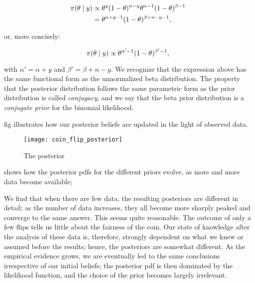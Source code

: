 \begin{align*}
    \pi \qty(\theta \mid y) &\propto \theta^y (1-\theta)^{n-y} \theta^{\alpha-1}(1-\theta)^{\beta -1} \\
    &= \theta^{\alpha + y -1} (1-\theta)^{\beta + n-y -1},
\end{align*}

or, more concisely:

\begin{equation}\label{eq:coin_posterior}
    \pi \qty(\theta \mid y) \propto \theta^{\alpha' -1} (1-\theta)^{\beta' -1},
\end{equation}

with $\alpha'=\alpha+y$ and $\beta' = \beta + n - y$. We recognize that the expression above has the same functional form as the unnormalized beta distribution. The property that the posterior distribution follows the same parametric form as the prior distribution is called \textit{conjugacy}, and we say that the beta prior distribution is a \textit{conjugate prior} for the binomial likelihood.  

fig illustrates how our posterior beliefs are updated in the light of observed data.

\begin{figure}[ht]
    \centering
    \texttt{[image: coin\_flip\_posterior]}
    \caption{The posterior
    }
    \label{fig:coin_flip_posterior}
\end{figure} 

shows how the posterior pdfs for the different priors evolve, as more and more data become available;


We find that when there are few data, the resulting posteriors are different in detail; as the number of data increases, they all become more sharply peaked and converge to the same answer. This seems quite reasonable. The outcome of only a few flips tells us little about the fairness of the coin. Our state of knowledge after the analysis of these data is, therefore, strongly dependent on what we knew or assumed before the results; hence, the posteriors are somewhat different. As the empirical evidence grows, we are eventually led to the same conclusions irrespective of our initial beliefs; the posterior pdf is then dominated by the likelihood function, and the choice of the prior becomes largely irrelevant.

